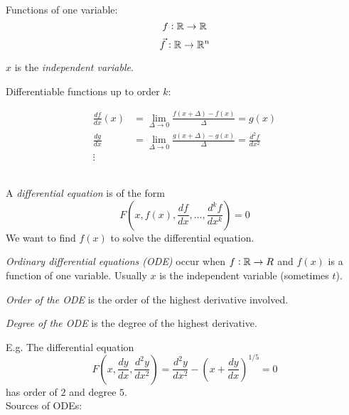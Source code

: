 \documentclass[twoside]{scrartcl}
\begin{document}
\TableofContents

\setcounter{page}{4}


\vspace*{5pt}


\begin{definition}

Functions of one variable:
\[f: \mathbb{R} \to \mathbb{R}\]	
\[\vec{f}: \mathbb{R} \to \mathbb{R}^n\]

$x$ is the \emph{independent variable}. 
\end{definition}

Differentiable functions up to order $k$: 

\[
\begin{aligned}
  \frac{df}{dx}(x) &= \lim_{\Delta \to 0} \frac{f(x + \Delta) - f(x)}{\Delta} = g(x)\\[0.2cm]
  \frac{dg}{dx} &= \lim_{\Delta \to 0} \frac{g(x + \Delta) - g(x)}{\Delta} = \frac{d^2f}{dx^2}\\
  \vdots 
\end{aligned}
\]~


\begin{definition}
A \emph{differential equation} is of the form
\[F\left(x,f(x),\frac{df}{dx},\dots,\frac{d^kf}{dx^k}\right) = 0\]
We want to find $f(x)$ to solve the differential equation.

\emph{Ordinary differential equations (ODE)} occur when $f: \mathbb{R} \to R$ and $f(x)$ is a function of one variable. Usually $x$ is the independent variable (sometimes $t$). 

\emph{Order of the ODE} is the order of the highest derivative involved. 

\emph{Degree of the ODE} is the degree of the highest derivative.
\end{definition}

E.g. The differential equation \[F\left(x,\dfrac{dy}{dx},\dfrac{d^2y}{dx^2}\right) = \dfrac{d^2y}{dx^2} - \left(x + \dfrac{dy}{dx}\right)^{1/5} = 0\]
 has order of $2$ and degree $5$.~\\ 


Sources of ODEs:
\end{document}
